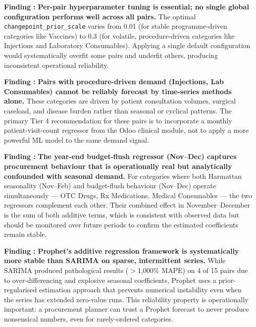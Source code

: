 \documentclass[12pt, a4paper]{article}
\newcounter{finding}
\newcommand{\finding}[1]{%
  \stepcounter{finding}%
  \begin{mdframed}[style=greenbox]
  \textbf{Finding \thefinding:} #1
  \end{mdframed}%
}
\begin{document}
\finding{%
  \textbf{Per-pair hyperparameter tuning is essential; no single
  global configuration performs well across all pairs.}
  The optimal \texttt{changepoint\_prior\_scale} varies from 0.01
  (for stable programme-driven categories like Vaccines) to 0.3
  (for volatile, procedure-driven categories like Injections and
  Laboratory Consumables). Applying a single default configuration
  would systematically overfit some pairs and underfit others,
  producing inconsistent operational reliability.
}

\finding{%
  \textbf{Pairs with procedure-driven demand (Injections, Lab Consumables)
  cannot be reliably forecast by time-series methods alone.}
  These categories are driven by patient consultation volumes, surgical
  caseload, and disease burden rather than seasonal or cyclical patterns.
  The primary Tier 4 recommendation for these pairs is to incorporate
  a monthly patient-visit-count regressor from the Odoo clinical module,
  not to apply a more powerful ML model to the same demand signal.
}

\finding{%
  \textbf{The year-end budget-flush regressor (Nov--Dec) captures
  procurement behaviour that is operationally real but analytically
  confounded with seasonal demand.} For categories where both Harmattan
  seasonality (Nov--Feb) and budget-flush behaviour (Nov--Dec) operate
  simultaneously --- OTC Drugs, Rx Medications, Medical Consumables ---
  the two regressors complement each other. Their combined effect in
  November--December is the sum of both additive terms, which is
  consistent with observed data but should be monitored over future
  periods to confirm the estimated coefficients remain stable.
}

\finding{%
  \textbf{Prophet's additive regression framework is systematically
  more stable than SARIMA on sparse, intermittent series.} While
  SARIMA produced pathological results ($>$1,000\% MAPE) on 4 of 15
  pairs due to over-differencing and explosive seasonal coefficients,
  Prophet uses a prior-regularised estimation approach that prevents
  numerical instability even when the series has extended zero-value
  runs. This reliability property is operationally important: a
  procurement planner can trust a Prophet forecast to never produce
  nonsensical numbers, even for rarely-ordered categories.
}

\end{document}
